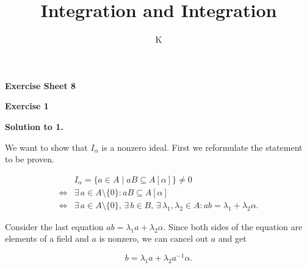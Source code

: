 \documentclass[a4paper]{article}
\title{Integration and Integration}
\author{K}
\theoremstyle{definition}
\begin{document}
\begin{center}
    \noindent\textbf{Exercise Sheet 8}
\end{center}
\noindent\textbf{Exercise 1}

\noindent\textbf{Solution to 1.}

\noindent We want to show that \(I_\alpha\) is a nonzero ideal. First we reformulate the statement to be proven.

\begin{align}
    & I_\alpha = \{a \in A \mid aB \subseteq A[\alpha]\} \neq {0} \\
    \iff & \exists \, a \in A \setminus \{0\} : aB \subseteq A[\alpha] \\
    \iff & \exists \, a \in A \setminus \{0\}, \, \exists \, b \in B, \, \exists \, \lambda_1, \lambda_2 \in A : a b = \lambda_1 + \lambda_2 \alpha \text{.}
\end{align}

Consider the last equation \(ab = \lambda_1 a + \lambda_2 \alpha\). Since both sides of the equation are elements of a field and \(a\) is nonzero, we can cancel out \(a\) and get

\begin{equation}
    b = \lambda_1 a + \lambda_2 a^{-1} \alpha \text{.}
\end{equation}
\end{document}
